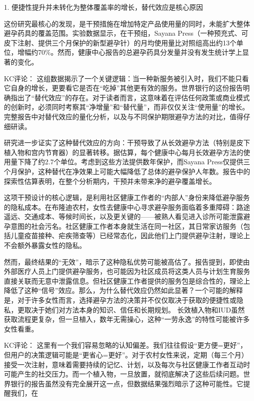 \documentclass[11pt]{ctexart}
\begin{document}
1. 便捷性提升并未转化为整体覆盖率的增长，替代效应是核心原因

这份研究最核心的发现，是干预措施在增加特定产品使用量的同时，未能扩大整体避孕药具的覆盖范围。实验数据显示，在干预组，Sayana Press（一种预充式、可皮下注射、提供三个月保护的新型避孕针）的月均使用量比对照组高出约13个单位，增幅约70\%。然而，健康中心报告的总避孕药具分发量并没有发生统计学上显著的变化。

KC评论： 这组数据揭示了一个关键逻辑：当一种新服务被引入时，我们不能只看它自身的增长，更要看它是否在“吃掉”其他更有效的服务。世界银行的这份报告明确指出了“替代效应”的存在。对于读者而言，这意味着在评估任何政策或商业模式的创新时，必须同时考察其“净增量”和“替代量”，而非仅仅关注“使用量”的增长。完整报告中对替代效应的量化分析，以及与不同保护期限避孕方法的对比，值得仔细研读。

研究进一步证实了这种替代效应的方向：干预导致了从长效避孕方法（特别是皮下植入物和宫内节育器）的显著转移。据估算，每个健康中心每月长效避孕方法的使用量下降了约2.7个单位。考虑到这些方法提供数年保护，而Sayana Press仅提供三个月保护，这种替代在净效果上可能大幅降低了总体的避孕保护人年数。报告中的探索性估算表明，在整个分析期内，干预并未带来净的避孕覆盖增长。

这项干预设计的核心逻辑，是利用社区健康工作者的“内部人”身份来降低避孕服务的隐私成本。在布隆迪农村，女性去健康中心寻求避孕服务面临着多重障碍：路途遥远、交通成本、等候时间长，以及更关键的——被熟人看见进入诊所可能泄露避孕意图的社会污名。社区健康工作者本身就生活在同一社区，其日常家访服务（包括儿童疫苗接种、疟疾筛查等）已经常态化，因此他们上门提供避孕注射，理论上不会额外暴露女性的隐私。

然而，最终结果的“无效”，暗示了这种隐私优势可能被高估了。报告提到，即使由外部医疗人员上门提供避孕服务，也可能因为社区成员将这类人员与计划生育服务直接关联而无意中泄露信息。但社区健康工作者提供的服务包是综合性的，理论上降低了这种“信号”效应。那么，为什么替代效应仍然如此显著？一个可能的解释是，对于许多女性而言，选择避孕方法的决策并不仅仅取决于获取的便捷性或隐私，更取决于她们对方法本身的知识、信任和长期规划。 长效植入物和IUD虽然获取流程更复杂，但一旦植入，数年无需操心，这种“一劳永逸”的特性可能被许多女性看重。

KC评论： 这里有一个我们容易忽略的认知偏差。我们往往假设“更方便=更好”，但用户的决策逻辑可能是“更省心=更好”。对于农村女性来说，定期（每三个月）接受一次注射，意味着需要持续的记忆、计划，以及每次与社区健康工作者互动时可能产生的社交压力。而一个植入物，一旦放置，就彻底解决了这些后续问题。世界银行的报告虽然没有完全展开这一点，但数据结果强烈暗示了这种可能性。它提醒我们，在
\end{document}
